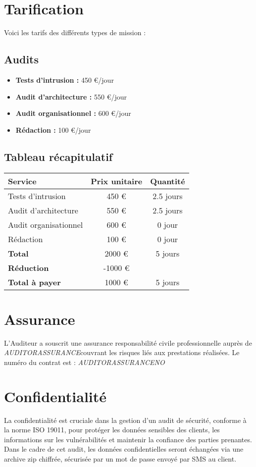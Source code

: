 \documentclass[12pt]{extarticle}
\begin{document}
\section{Tarification}
Voici les tarifs des différents types de mission :
\subsection{Audits}
\begin{itemize}
    \item \textbf{Tests d'intrusion :} 450 €/jour
    \item \textbf{Audit d'architecture :} 550 €/jour
    \item \textbf{Audit organisationnel :} 600 €/jour
    \item \textbf{Rédaction :} 100 €/jour
\end{itemize}
\subsection{Tableau récapitulatif}
\begin{center}
    \begin{tabular}{lcc}
        \toprule
        \textbf{Service} & \textbf{Prix unitaire} & \textbf{Quantité} \\
        \midrule
        Tests d'intrusion & 450 € & 2.5 jours \\
        Audit d'architecture & 550 € & 2.5 jours \\
        Audit organisationnel & 600 € & 0 jour \\
        Rédaction & 100 € & 0 jour \\
        \midrule
        \textbf{Total} & 2000 € & 5 jours \\
        \midrule
        \textbf{Réduction} & -1000 € &  \\
        \midrule
        \textbf{Total à payer} & 1000 € & 5 jours \\
        \bottomrule
    \end{tabular}
\end{center}
\newpage
\section{Assurance}
L'Auditeur a souscrit une assurance responsabilité civile professionnelle auprès de \textit{ {{AUDITORASSURANCE}}}couvrant les risques liés aux prestations réalisées.
Le numéro du contrat est : \textit{ {{AUDITORASSURANCENO}}}
\section{Confidentialité}
La confidentialité est cruciale dans la gestion d'un audit de sécurité, conforme à la norme ISO 19011, pour protéger les données sensibles des clients, les informations sur les vulnérabilités et maintenir la confiance des parties prenantes.
Dans le cadre de cet audit, les données confidentielles seront échangées via une archive zip chiffrée, sécurisée par un mot de passe envoyé par SMS au client.
\newpage
\end{document}
